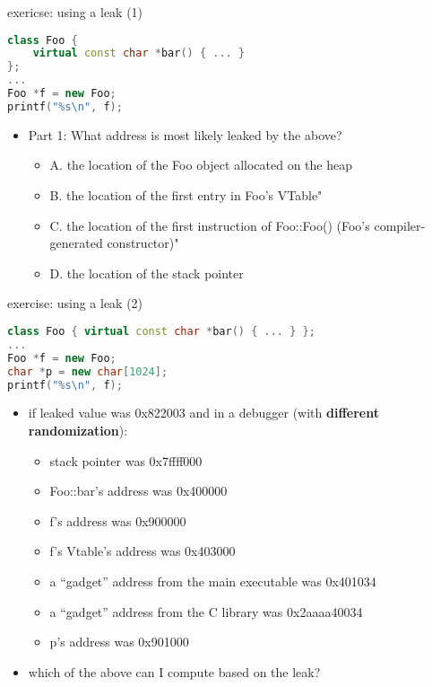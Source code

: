 \begin{frame}[fragile,label=useLeak1]{exericse: using a leak (1)}
\begin{lstlisting}[language=C++,style=small]
class Foo {
    virtual const char *bar() { ... }
};
...
Foo *f = new Foo;
printf("%s\n", f);
\end{lstlisting}
\begin{itemize}
\item Part 1: What address is most likely leaked by the above?
    \begin{itemize}
    \item A. the location of the Foo object allocated on the heap
    \item B. the location of the first entry in Foo's VTable"
    \item C. the location of the first instruction of Foo::Foo() (Foo's compiler-generated constructor)"
    \item D. the location of the stack pointer
    \end{itemize}
\end{itemize}
\end{frame}


\begin{frame}[fragile,label=useLeak2]{exercise: using a leak (2)}
\begin{lstlisting}[language=C++,style=script]
class Foo { virtual const char *bar() { ... } };
...
Foo *f = new Foo;
char *p = new char[1024];
printf("%s\n", f);
\end{lstlisting}
\begin{itemize}
\item if leaked value was 0x822003 and in a debugger (with \textbf{different randomization}):
    \begin{itemize}
    \item stack pointer was 0x7ffff000
    \item Foo::bar's address was 0x400000
    \item f's address was 0x900000
    \item f's Vtable's address was 0x403000
    \item a ``gadget'' address from the main executable was 0x401034
    \item a ``gadget'' address from the C library was 0x2aaaa40034
    \item p's address was 0x901000
    \end{itemize}
\item which of the above can I compute based on the leak?
\end{itemize}
\end{frame}
